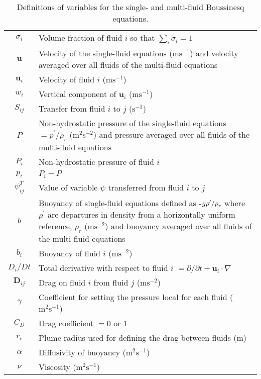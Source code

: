 \documentclass[draft]{agujournal2019}
\begin{document}
\begin{table}
\begin{tabular}{c>{\raggedright}p{}}
$\sigma_{i}$ & Volume fraction of fluid $i$ so that $\sum_{i}\sigma_{i}=1$\tabularnewline
$\mathbf{u}$ & 
Velocity of the single-fluid equations  ($\text{m}\text{s}^{-1}$) and velocity averaged over all fluids of the multi-fluid equations
\tabularnewline
$\mathbf{u}_{i}$ & Velocity of fluid $i$ ($\text{m}\text{s}^{-1}$)\tabularnewline
$w_{i}$ & Vertical component of $\mathbf{u}_{i}$ ($\text{m}\text{s}^{-1}$)\tabularnewline
$S_{ij}$ & Transfer from fluid $i$ to $j$ ($\text{s}^{-1}$)
\tabularnewline
$P$ & Non-hydrostatic pressure of the single-fluid equations $=p^{\prime}/\rho_{r}$ ($\text{m}^{2}\text{s}^{-2}$) and pressure averaged over all fluids of the multi-fluid equations
\tabularnewline
$P_{i}$ & Non-hydrostatic pressure of fluid $i$ 
\tabularnewline
$p_{i}$ & $P_i - P$
\tabularnewline
$\psi_{ij}^{T}$ & Value of variable $\psi$ transferred from fluid $i$ to $j$\tabularnewline
$b$ & Buoyancy of single-fluid equations defined as -$g\rho^{\prime}/\text{\ensuremath{\rho}}_{r}$
where $\rho^{\prime}$ are departures in density from a horizontally
uniform reference, $\rho_{r}$ ($\text{m}\text{s}^{-2}$) and buoyancy averaged over all fluids of the multi-fluid equations
\tabularnewline
$b_{i}$ & Buoyancy of fluid $i$ ($\text{m}\text{s}^{-2}$)\tabularnewline
$D_{i}\big/Dt$ & Total derivative with respect to fluid $i$ $=\partial/\partial t+\mathbf{u}_{i}\cdot\nabla$\tabularnewline
$\mathbf{D}_{ij}$ & Drag on fluid $i$ from fluid $j$ ($\text{m}\text{s}^{-2}$)\tabularnewline
$\gamma$ & Coefficient for setting the pressure local for each fluid ($\text{m}^{2}\text{s}^{-1}$)\tabularnewline
$C_{D}$ & Drag coefficient $=0$ or 1\tabularnewline
$r_{c}$ & Plume radius used for defining the drag between fluids (m)\tabularnewline
$\alpha$ & Diffusivity of buoyancy ($\text{m}^{2}\text{s}^{-1}$)\tabularnewline
$\nu$ & Viscosity ($\text{m}^{2}\text{s}^{-1}$)\tabularnewline
\end{tabular}
\caption{Definitions of variables for the single- and multi-fluid Boussinesq equations.\label{tab:defns}}
\end{table}
\end{document}
